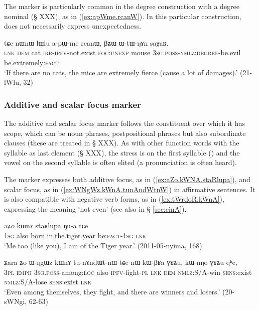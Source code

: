 The marker  is particularly common in the degree construction with a  degree nominal (§ XXX), as in (\ref{ex:apWme.rcanW}). In this particular construction,   does not necessarily express unexpectedness.

\begin{exe}
\ex \label{ex:apWme.rcanW}
 \gll  tɕe nɯnɯ lɯlu a-pɯ-me rcanɯ, βʑɯ ɯ-tɯ-ŋɤn saχaʁ. \\
 \textsc{lnk} \textsc{dem} cat \textsc{irr}-\textsc{ipfv}-not.exist \textsc{foc}:\textsc{unexp} mouse
 \textsc{3sg}.\textsc{poss}-\textsc{nmlz}:\textsc{degree}-be.evil be.extremely:\textsc{fact} \\ 
 \glt `If there are no cats, the mice are extremely fierce (cause a lot of damages).' (21-lWlu, 32) 
\end{exe}

 \subsubsection{Additive and scalar focus marker  } \label{sec:kWnA}
The additive and scalar focus marker  follows the constituent over which it has scope, which can be noun phrases, postpositional phrases but also subordinate clauses (these are treated in § XXX). As with other function words with the syllable  as last element (§ XXX), the stress is on the first syllable () and the vowel on the second syllable is often elited (a pronunciation  is often heard). 

The marker  expresses both additive focus, as in (\ref{ex:aZo.kWNA.staRlupa}), and scalar focus, as in (\ref{ex:WNgWz.kWnA.tunAndWtnW}) in affirmative sentences. It is also compatible with negative verb forms, as in (\ref{ex:tWrdoR.kWnA}), expressing the meaning `not even' (see also  in § \ref{sec:cinA}).

\begin{exe}
\ex \label{ex:aZo.kWNA.staRlupa}
\gll aʑo kɯnɤ staʁlupa ŋu-a tɕe \\
\textsc{1sg} also born.in.the.tiger.year be:\textsc{fact}-\textsc{1sg} \textsc{lnk} \\
\glt `Me too (like you), I am of the Tiger year.' (2011-05-nyima, 168)
\end{exe}

\begin{exe}
\ex \label{ex:WNgWz.kWnA.tunAndWtnW}
\gll ʑara ʑo ɯ-ŋgɯz kɯnɤ tu-nɤndɯt-nɯ tɕe nɯ kɯ-βʁa ɣɤʑu, kɯ-nŋo ɣɤʑu qʰe, \\
\textsc{3pl} \textsc{emph} \textsc{3sg}.\textsc{poss}-among:\textsc{loc} also \textsc{ipfv}-fight-\textsc{pl} \textsc{lnk} \textsc{dem} \textsc{nmlz}:S/A-win \textsc{sens}:exist \textsc{nmlz}:S/A-lose  \textsc{sens}:exist \textsc{lnk} \\
\glt `Even among themselves, they fight, and there are winners and losers.' (20-sWNgi, 62-63)
\end{exe}
 
